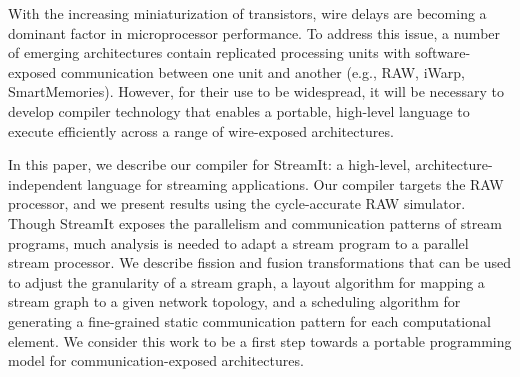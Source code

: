 With the increasing miniaturization of transistors, wire delays are
becoming a dominant factor in microprocessor performance.  To address
this issue, a number of emerging architectures contain replicated
processing units with software-exposed communication between one unit
and another (e.g., RAW, iWarp, SmartMemories).  However, for
their use to be widespread, it will be necessary to develop compiler
technology that enables a portable, high-level language to execute
efficiently across a range of wire-exposed architectures.

In this paper, we describe our compiler for StreamIt: a high-level,
architecture-independent language for streaming applications.  Our
compiler targets the RAW processor, and we present results using the
cycle-accurate RAW simulator.  Though StreamIt exposes the parallelism
and communication patterns of stream programs, much analysis is needed
to adapt a stream program to a parallel stream processor.  We describe
fission and fusion transformations that can be used to adjust the
granularity of a stream graph, a layout algorithm for mapping a stream
graph to a given network topology, and a scheduling algorithm for
generating a fine-grained static communication pattern for each
computational element.  We consider this work to be a first step
towards a portable programming model for communication-exposed
architectures.
